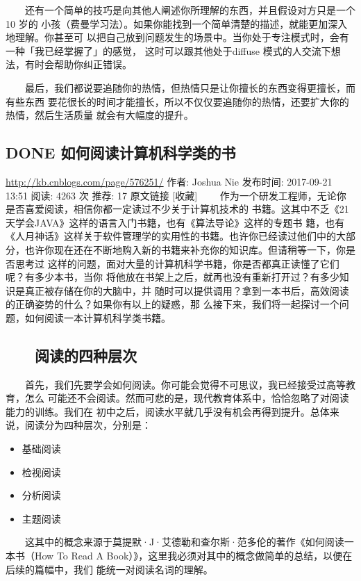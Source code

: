\documentclass[11pt]{ctexart}
\begin{document}
{{{{　　还有一个简单的技巧是向其他人阐述你所理解的东西，并且假设对方只是一个 10 岁的
小孩（费曼学习法）。如果你能找到一个简单清楚的描述，就能更加深入地理解。你甚至可
以把自己放到问题发生的场景中。当你处于专注模式时，会有一种「我已经掌握了」的感觉，
这时可以跟其他处于diffuse 模式的人交流下想法，有时会帮助你纠正错误。



　　最后，我们都说要追随你的热情，但热情只是让你擅长的东西变得更擅长，而有些东西
要花很长的时间才能擅长，所以不仅仅要追随你的热情，还要扩大你的热情，然后生活质量
就会有大幅度的提升。

\subsection{{\bfseries\sffamily DONE} 如何阅读计算机科学类的书}
\label{sec:orgc6619da}
\url{http://kb.cnblogs.com/page/576251/}
作者: Joshua Nie  发布时间: 2017-09-21 13:51  阅读: 4263 次  推荐: 17   原文链接
[收藏]
　　作为一个研发工程师，无论你是否喜爱阅读，相信你都一定读过不少关于计算机技术的
书籍。这其中不乏《21天学会JAVA》这样的语言入门书籍，也有《算法导论》这样的专题书
籍，也有《人月神话》这样关于软件管理学的实用性的书籍。也许你已经读过他们中的大部
分，也许你现在还在不断地购入新的书籍来补充你的知识库。但请稍等一下，你是否思考过
这样的问题，面对大量的计算机科学书籍，你是否都真正读懂了它们呢？有多少本书，当你
将他放在书架上之后，就再也没有重新打开过？有多少知识是真正被存储在你的大脑中，并
随时可以提供调用？拿到一本书后，高效阅读的正确姿势的什么？如果你有以上的疑惑，那
么接下来，我们将一起探讨一个问题，如何阅读一本计算机科学类书籍。
\subsection{　　阅读的四种层次}
\label{sec:org64f19b4}
　　首先，我们先要学会如何阅读。你可能会觉得不可思议，我已经接受过高等教育，怎么
可能还不会阅读。然而可悲的是，现代教育体系中，恰恰忽略了对阅读能力的训练。我们在
初中之后，阅读水平就几乎没有机会再得到提升。总体来说，阅读分为四种层次，分别是：
\begin{itemize}
\item 基础阅读
\item 检视阅读
\item 分析阅读
\item 主题阅读
\end{itemize}
　　这其中的概念来源于莫提默·J·艾德勒和查尔斯·范多伦的著作《如何阅读一本书（How
To Read A Book）》，这里我必须对其中的概念做简单的总结，以便在后续的篇幅中，我们
能统一对阅读名词的理解。
}}}}
\end{document}
